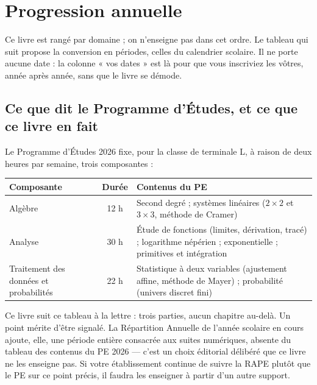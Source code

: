 \chapter{Progression annuelle}

Ce livre est rangé par domaine ; on n'enseigne pas dans cet ordre. Le tableau
qui suit propose la conversion en périodes, celles du calendrier scolaire.
Il ne porte aucune date : la colonne « vos dates » est là pour que vous
inscriviez les vôtres, année après année, sans que le livre se démode.

\section{Ce que dit le Programme d'Études, et ce que ce livre en fait}

Le Programme d'Études 2026 fixe, pour la classe de terminale L, à raison de
deux heures par semaine, trois composantes :

\begin{center}\footnotesize
\renewcommand{\arraystretch}{1.35}
\begin{tabular}{|L{3.4cm}|c|L{6.2cm}|}
\hline
\textbf{Composante} & \textbf{Durée} & \textbf{Contenus du PE}\\
\hline
Algèbre & 12 h & Second degré ; systèmes linéaires ($2\times2$ et
$3\times3$, méthode de Cramer)\\
Analyse & 30 h & Étude de fonctions (limites, dérivation, tracé) ;
logarithme népérien ; exponentielle ; primitives et intégration\\
Traitement des données et probabilités & 22 h & Statistique à deux
variables (ajustement affine, méthode de Mayer) ; probabilité (univers
discret fini)\\
\hline
\end{tabular}
\end{center}

Ce livre suit ce tableau à la lettre : trois parties, aucun chapitre au-delà.
Un point mérite d'être signalé. La Répartition Annuelle de l'année scolaire
en cours ajoute, elle, une période entière consacrée aux suites numériques,
absente du tableau des contenus du PE 2026 — c'est un choix éditorial
délibéré que ce livre ne les enseigne pas. Si votre établissement continue de
suivre la RAPE plutôt que le PE sur ce point précis, il faudra les enseigner
à partir d'un autre support.

